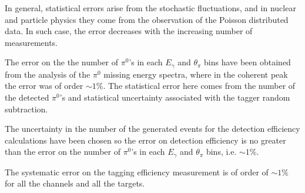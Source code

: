 \indent In general, statistical errors arise from the stochastic fluctuations, and in nuclear and particle physics they come from the observation of the Poisson distributed data. In such case, the error decreases with the increasing number of measurements.

\indent The error on the the number of $\pi^{0}$'s in each $E_{\gamma}$ and $\theta_{\pi}$ bins have been obtained from the analysis of the $\pi^{0}$ missing energy spectra, where in the coherent peak the error was of order $\sim 1\%$. The statistical error here comes from the number of the detected $\pi^{0}$'s and statistical uncertainty associated with the tagger random subtraction.

\indent The uncertainty in the number of the generated events for the detection efficiency calculations have been chosen so the error on detection efficiency is no greater than the error on the number of $\pi^{0}$'s in each $E_{\gamma}$ and $\theta_{\pi}$ bins, i.e. $\sim 1\%$.

\indent The systematic error on the tagging efficiency measurement is of order of $\sim 1\%$ for all the channels and all the targets.